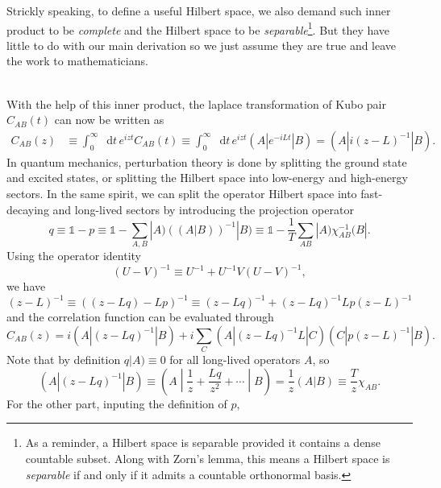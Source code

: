 \documentclass[10pt,nofootinbib,letterpaper]{revtex4}
\newcommand*\dd{\mathop{}\!\mathrm{d}}
\newcounter{Note}[section]
\newenvironment{Note}[1][]{{\par\normalfont\bfseries \underline{Note~\stepcounter{Note}\arabic{Note}.}~#1~~}}{\par}
\begin{document}
		\begin{Note}
			Strickly speaking, to define a useful Hilbert space, we also demand such inner product to be \emph{complete} and the Hilbert space to be \emph{separable}\footnote{As a reminder, a Hilbert space is separable provided it contains a dense countable subset. Along with Zorn's lemma, this means a Hilbert space is \emph{separable} if and only if it admits a countable orthonormal basis.}. But they have little to do with our main derivation so we just assume they are true and leave the work to mathematicians. 
		\end{Note}
		\hfill\\
		With the help of this inner product, the laplace transformation of Kubo pair $C_{AB}(t)$ can now be written as
		\begin{align*}
			C_{AB}(z)&\equiv\int_0^\infty\dd t\, e^{izt}C_{AB}(t)\equiv\int_0^\infty\dd t\, e^{izt}(A|e^{-iLt}|B)=(A|i(z-L)^{-1}|B).
		\end{align*}
		\indent In quantum mechanics, perturbation theory is done by splitting the ground state and excited states, or splitting the Hilbert space into low-energy and high-energy sectors. In the same spirit, we can split the operator Hilbert space into fast-decaying and long-lived sectors by introducing the projection operator
		\begin{equation*}
			q\equiv\mathds{1}-p\equiv\mathds{1}-\sum_{A,B}|A)\left((A|B)\right)^{-1}|B)\equiv\mathds{1}-\dfrac{1}{T}\sum_{AB}|A)\chi_{AB}^{-1}(B|.
		\end{equation*}
		Using the operator identity
		\begin{equation}\label{1.2.3}
			(U-V)^{-1}\equiv U^{-1}+U^{-1}V(U-V)^{-1},
		\end{equation}
		we have
		\begin{equation*}
			(z-L)^{-1}\equiv((z-Lq)-Lp)^{-1}\equiv(z-Lq)^{-1}+(z-Lq)^{-1}Lp(z-L)^{-1}
		\end{equation*}
		and the correlation function can be evaluated through
		\begin{equation*}
			C_{AB}(z)=i(A|(z-Lq)^{-1}|B)+i\sum_C(A|(z-Lq)^{-1}L|C)(C|p(z-L)^{-1}|B).
		\end{equation*}
		Note that by definition $q|A)\equiv 0$ for all long-lived operators $A$, so
		\begin{equation*}
			(A|(z-Lq)^{-1}|B)\equiv \left(A\middle|\dfrac{1}{z}+\dfrac{Lq}{z^2}+\cdots\middle| B\right)=\dfrac{1}{z}(A|B)\equiv\dfrac{T}{z}\chi_{AB}. 
		\end{equation*}
		For the other part, inputing the definition of $p$, 
\end{document}
